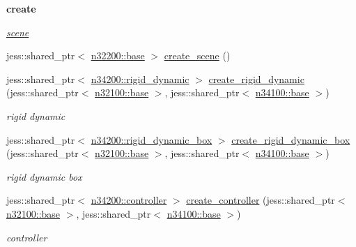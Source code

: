 \begin{Indent}{\bf create}\par
{\em \label{_amgrp76ea0bebb3c22822b4f0dd9c9fd021c5}
 \hyperlink{namespacenebula_1_1content_1_1scene}{scene} }\begin{DoxyCompactItemize}
\item 
jess::shared\_\-ptr$<$ \hyperlink{classnebula_1_1content_1_1scene_1_1physics_1_1base}{n32200::base} $>$ \hyperlink{classnebula_1_1content_1_1physics_1_1base_a270629bb6c29e5d3121059ed434fbfaf}{create\_\-scene} ()
\item 
jess::shared\_\-ptr$<$ \hyperlink{classnebula_1_1content_1_1actor_1_1physics_1_1rigid__dynamic}{n34200::rigid\_\-dynamic} $>$ \hyperlink{classnebula_1_1content_1_1physics_1_1base_a7a8b7ec354839b2d87ab5ef8b20e5da2}{create\_\-rigid\_\-dynamic} (jess::shared\_\-ptr$<$ \hyperlink{classnebula_1_1content_1_1scene_1_1admin_1_1base}{n32100::base} $>$, jess::shared\_\-ptr$<$ \hyperlink{classnebula_1_1content_1_1actor_1_1admin_1_1base}{n34100::base} $>$)
\begin{DoxyCompactList}\small\item\em rigid dynamic \item\end{DoxyCompactList}\item 
jess::shared\_\-ptr$<$ \hyperlink{classnebula_1_1content_1_1actor_1_1physics_1_1rigid__dynamic__box}{n34200::rigid\_\-dynamic\_\-box} $>$ \hyperlink{classnebula_1_1content_1_1physics_1_1base_ab0f705269191e10cdde2f83b7c96413b}{create\_\-rigid\_\-dynamic\_\-box} (jess::shared\_\-ptr$<$ \hyperlink{classnebula_1_1content_1_1scene_1_1admin_1_1base}{n32100::base} $>$, jess::shared\_\-ptr$<$ \hyperlink{classnebula_1_1content_1_1actor_1_1admin_1_1base}{n34100::base} $>$)
\begin{DoxyCompactList}\small\item\em rigid dynamic box \item\end{DoxyCompactList}\item 
jess::shared\_\-ptr$<$ \hyperlink{classnebula_1_1content_1_1actor_1_1physics_1_1controller}{n34200::controller} $>$ \hyperlink{classnebula_1_1content_1_1physics_1_1base_a59cf1db2c6a98d9054db303a71019621}{create\_\-controller} (jess::shared\_\-ptr$<$ \hyperlink{classnebula_1_1content_1_1scene_1_1admin_1_1base}{n32100::base} $>$, jess::shared\_\-ptr$<$ \hyperlink{classnebula_1_1content_1_1actor_1_1admin_1_1base}{n34100::base} $>$)
\begin{DoxyCompactList}\small\item\em controller \item\end{DoxyCompactList}\item 

\end{DoxyCompactItemize}
\end{Indent}
